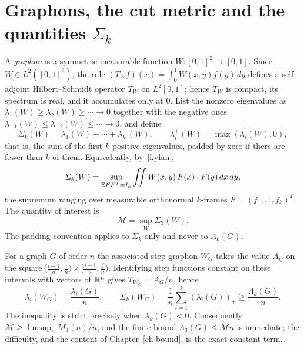\section{Graphons, the cut metric and the quantities $\Sigma_k$}\label{sec-graphons}
A \emph{graphon} is a symmetric measurable function $W:[0,1]^2\to[0,1]$.
Since $W\in L^2([0,1]^2)$, the rule
$(T_Wf)(x)=\int_0^1W(x,y)f(y)\,dy$ defines a self-adjoint
Hilbert--Schmidt operator $T_W$ on $L^2[0,1]$; hence $T_W$ is compact, its
spectrum is real, and it accumulates only at $0$.
List the nonzero eigenvalues as
$\lambda_1(W)\ge\lambda_2(W)\ge\cdots\to0$ together with the negative ones
$\lambda_{-1}(W)\le\lambda_{-2}(W)\le\cdots\to0$, and define
\begin{equation}\label{sigmak-def}
 \Sigma_k(W)=\lambda_1(W)+\cdots+\lambda_k^+(W),
 \qquad \lambda_i^+(W)=\max(\lambda_i(W),0),
\end{equation}
that is, the sum of the first $k$ positive eigenvalues, padded by zero if
there are fewer than $k$ of them. Equivalently, by~\eqref{kyfan},
\[
 \Sigma_k(W)=\sup_{\mathbb E FF^T=I_k}\iint W(x,y)\,F(x)\cdot F(y)\,dx\,dy,
\]
the supremum ranging over measurable orthonormal $k$-frames
$F=(f_1,\ldots,f_k)^T$. The quantity of interest is
\begin{equation}\label{M-def}
 \mathcal M=\sup_W\Sigma_3(W).
\end{equation}
The padding convention applies to $\Sigma_k$ only and never to $\Lambda_k(G)$.

For a graph $G$ of order $n$ the associated step graphon $W_G$ takes the
value $A_{ij}$ on the square $[\tfrac{i-1}n,\tfrac in)\times
[\tfrac{j-1}n,\tfrac jn)$. Identifying step functions constant on these
intervals with vectors of $\mathbb R^n$ gives $T_{W_G}=A_G/n$, hence
\begin{equation}\label{wg-spectrum}
 \lambda_i(W_G)=\frac{\lambda_i(G)}n,
 \qquad
 \Sigma_k(W_G)=\frac1n\sum_{i=1}^k(\lambda_i(G))_+\ge\frac{\Lambda_k(G)}n .
\end{equation}
The inequality is strict precisely when $\lambda_k(G)<0$. Consequently
$\mathcal M\ge\limsup_n M_3(n)/n$, and the finite bound
$\Lambda_3(G)\le\mathcal M n$ is immediate; the difficulty, and the content of
Chapter~\ref{ch-bound}, is the exact constant term.

